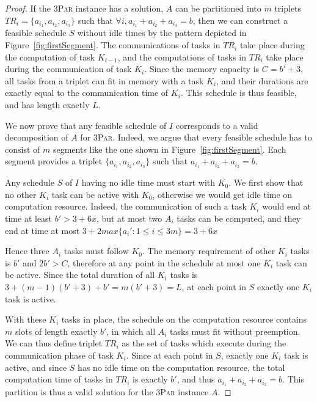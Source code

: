 \documentclass[runningheads]{llncs} %
\newcommand{\threepart}{\textsc{3Par}\xspace}
\begin{document}
\begin{proof}
	
	If the \threepart instance has a solution, $A$ can be partitioned into
	$m$ triplets $TR_i = \{a_{i_1}, a_{i_2}, a_{i_3}\}$ such that $\forall
	i, a_{i_1} + a_{i_2} + a_{i_3} = b$, then we can construct a feasible
	schedule $S$ without idle times by the pattern depicted in
	Figure~\ref{fig:firstSegment}. The communications of tasks in $TR_i$ take
	place during the computation of task $K_{i-1}$, and the computations
	of tasks in $TR_i$ take place during the communication of task
	$K_i$. Since the memory capacity is $C=b'+3$, all tasks from a triplet
	can fit in memory with a task $K_i$, and their durations are exactly
	equal to the communication time of $K_i$. This schedule is thus
	feasible, and has length exactly $L$.
	
	\medskip
	
	We now prove that any feasible schedule of $I$ corresponds to a valid
	decomposition of $A$ for \threepart. Indeed, we argue that every
	feasible schedule has to consist of $m$ segments like the one shown in
	Figure~\ref{fig:firstSegment}. Each segment provides a triplet
	$\{a_{i_1}, a_{i_2}, a_{i_3}\}$ such that $a_{i_1} + a_{i_2} + a_{i_3}
	= b$.
	
	Any schedule $S$ of $I$ having no idle time must start with $K_0$. We
	first show that no other $K_i$ task can be active with $K_0$,
	otherwise we would get idle time on computation resource. Indeed, the
	communication of such a task $K_i$ would end at time at least $b'>3 +
	6x$, but at most two $A_i$ tasks can be computed, and they end at time
	at most $3+2max\{a_i':1\le i\le 3m\} = 3 + 6x$
	
	Hence three $A_i$ tasks must follow $K_0$. The memory requirement of
	other $K_i$ tasks is $b'$ and $2b'>C$, therefore at any point in the
	schedule at most one $K_i$ task can be active. Since the total
	duration of all $K_i$ tasks is $3 + (m-1)(b'+3) + b' = m (b'+3)=L$, at
	each point in $S$ exactly one $K_i$ task is active.
	
	With these $K_i$ tasks in place, the schedule on the computation
	resource contains $m$ slots of length exactly $b'$, in which all $A_i$
	tasks must fit without preemption. We can thus define triplet $TR_i$
	as the set of tasks which execute during the communication phase of
	task $K_i$. Since at each point in $S$, exactly one $K_i$ task is
	active, and since $S$ has no idle time on the computation resource,
	the total computation time of tasks in $TR_i$ is exactly $b'$, and thus
	$a_{i_1} + a_{i_2} + a_{i_3} = b$. This partition is thus a valid
	solution for the \threepart instance $A$. 
	
\end{proof}
\end{document}
